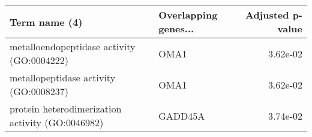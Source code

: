 \begin{tabular}{llr}
\toprule
                                   Term name (4) & Overlapping genes... &  Adjusted p-value \\
\midrule
      metalloendopeptidase activity (GO:0004222) &                 OMA1 &          3.62e-02 \\
          metallopeptidase activity (GO:0008237) &                 OMA1 &          3.62e-02 \\
protein heterodimerization activity (GO:0046982) &              GADD45A &          3.74e-02 \\
\bottomrule
\end{tabular}
